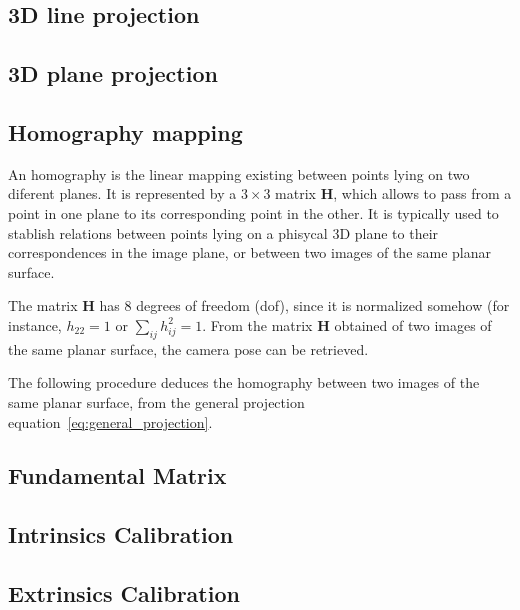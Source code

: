 \subsection{3D line projection}

\subsection{3D plane projection}

\subsection{Homography mapping}
An homography is the linear mapping existing between points lying on two diferent planes. It is represented by a $3\times 3$ matrix $\mathbf{H}$, which allows to pass from a point in one plane to its corresponding point in the other. It is typically used to stablish relations between points lying on a phisycal 3D plane to their correspondences in the image plane, or between two images of the same planar surface. 

The matrix $\mathbf{H}$ has $8$ degrees of freedom (dof), since it is normalized somehow (for instance, $h_{22}=1$ or $\sum_{ij} h^2_{ij} = 1$. From the matrix $\mathbf{H}$ obtained of two images of the same planar surface, the camera pose can be retrieved. 

The following procedure deduces the homography between two images of the same planar surface, from the general projection equation~\ref{eq:general_projection}. 

\subsection{Fundamental Matrix} 

\subsection{Intrinsics Calibration} 

\subsection{Extrinsics Calibration} 

